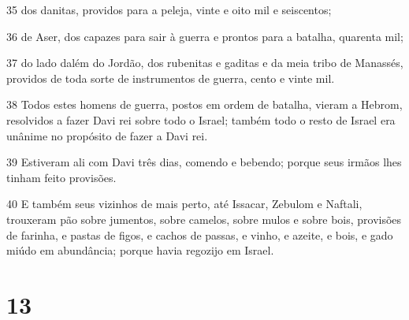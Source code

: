 \par 35 dos danitas, providos para a peleja, vinte e oito mil e seiscentos;
\par 36 de Aser, dos capazes para sair à guerra e prontos para a batalha, quarenta mil;
\par 37 do lado dalém do Jordão, dos rubenitas e gaditas e da meia tribo de Manassés, providos de toda sorte de instrumentos de guerra, cento e vinte mil.
\par 38 Todos estes homens de guerra, postos em ordem de batalha, vieram a Hebrom, resolvidos a fazer Davi rei sobre todo o Israel; também todo o resto de Israel era unânime no propósito de fazer a Davi rei.
\par 39 Estiveram ali com Davi três dias, comendo e bebendo; porque seus irmãos lhes tinham feito provisões.
\par 40 E também seus vizinhos de mais perto, até Issacar, Zebulom e Naftali, trouxeram pão sobre jumentos, sobre camelos, sobre mulos e sobre bois, provisões de farinha, e pastas de figos, e cachos de passas, e vinho, e azeite, e bois, e gado miúdo em abundância; porque havia regozijo em Israel.

\chapter{13}

